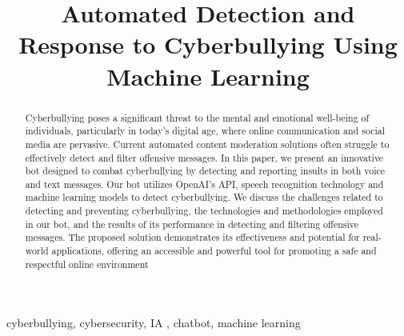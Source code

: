 \documentclass[conference]{IEEEtran}
\begin{document}
\title{Automated Detection and Response to Cyberbullying Using Machine Learning  \\
}

\author{
\and
{}
\and
{}
\and
{}
}

\maketitle

\begin{abstract}
Cyberbullying poses a significant threat to the mental and emotional well-being of individuals, particularly in today's digital age, where online communication and social media are pervasive. Current automated content moderation solutions often struggle to effectively detect and filter offensive messages. In this paper, we present an innovative bot designed to combat cyberbullying by detecting and reporting insults in both voice and text messages. Our bot utilizes OpenAI's API, speech recognition technology and machine learning models to detect cyberbullying. We discuss the challenges related to detecting and preventing cyberbullying, the technologies and methodologies employed in our bot, and the results of its performance in detecting and filtering offensive messages. The proposed solution demonstrates its effectiveness and potential for real-world applications, offering an accessible and powerful tool for promoting a safe and respectful online environment
\end{abstract}

\begin{IEEEkeywords}
cyberbullying, cybersecurity, IA , chatbot, machine learning
\end{IEEEkeywords}
\end{document}
